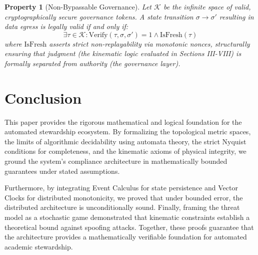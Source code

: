 \documentclass[conference]{IEEEtran}
\newtheorem{property}{Property}
\begin{document}
\begin{property}[Non-Bypassable Governance]
Let $\mathcal{K}$ be the infinite space of valid, cryptographically secure governance tokens. A state transition $\sigma \to \sigma'$ resulting in data egress is legally valid if and only if:
\begin{equation}
\exists \tau \in \mathcal{K} : \text{Verify}(\tau, \sigma, \sigma') = 1 \land \text{IsFresh}(\tau)
\end{equation}
where $\text{IsFresh}$ asserts strict non-replayability via monotonic nonces, structurally ensuring that judgment (the kinematic logic evaluated in Sections III-VIII) is formally separated from authority (the governance layer).
\end{property}

\section{Conclusion}
This paper provides the rigorous mathematical and logical foundation for the automated stewardship ecosystem. By formalizing the topological metric spaces, the limits of algorithmic decidability using automata theory, the strict Nyquist conditions for completeness, and the kinematic axioms of physical integrity, we ground the system's compliance architecture in mathematically bounded guarantees under stated assumptions. 

Furthermore, by integrating Event Calculus for state persistence and Vector Clocks for distributed monotonicity, we proved that under bounded error, the distributed architecture is unconditionally sound. Finally, framing the threat model as a stochastic game demonstrated that kinematic constraints establish a theoretical bound against spoofing attacks. Together, these proofs guarantee that the architecture provides a mathematically verifiable foundation for automated academic stewardship.
\end{document}
